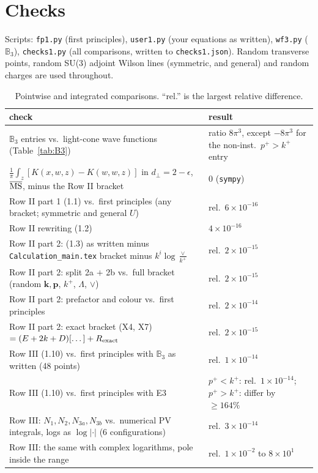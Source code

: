 \documentclass[10pt]{article}
\numberwithin{equation}{section}
\def\mf#1{\mathbb{#1}}
\newcommand{\bk}{\mathbf k}
\newcommand{\bp}{\mathbf p}
\begin{document}
\section{Checks}\label{sec:checks}
Scripts: \texttt{fp1.py} (first principles), \texttt{user1.py} (your equations as written), \texttt{wf3.py} ($\mf B_3$), \texttt{checks1.py} (all comparisons, written to \texttt{checks1.json}). Random transverse points, random SU(3) adjoint Wilson lines (symmetric, and general) and random charges are used throughout.
\begin{longtable}{@{}p{}p{}@{}}
\caption{Pointwise and integrated comparisons. ``rel.'' is the largest relative difference.}\label{tab:all}\\\toprule
check & result\\\midrule
$\mf B_3$ entries vs.\ light-cone wave functions (Table~\ref{tab:B3}) & ratio $8\pi^3$, except $-8\pi^3$ for the non-inst.\ $p^+>k^+$ entry\\
$\frac1\pi\int_z[K(x,w,z)-K(w,w,z)]$ in $d_\perp=2-\epsilon$, $\overline{\rm MS}$, minus the Row II bracket & $0$ (\texttt{sympy})\\
Row II part 1 (1.1) vs.\ first principles (any bracket; symmetric and general $U$) & rel.\ $6\times10^{-16}$\\
Row II rewriting (1.2) & $4\times10^{-16}$\\
Row II part 2: (1.3) as written minus \texttt{Calculation\_main.tex} bracket minus $k^i\log\frac{\vee}{k^+}$ & rel.\ $2\times10^{-15}$\\
Row II part 2: split 2a $+$ 2b vs.\ full bracket (random $\bk,\bp$, $k^+$, $\Lambda$, $\vee$) & rel.\ $2\times10^{-15}$\\
Row II part 2: prefactor and colour vs.\ first principles & rel.\ $2\times10^{-14}$\\
Row II part 2: exact bracket (X4, X7) $=(E+2k+D)[\dots]+R_{\rm exact}$ & rel.\ $2\times10^{-15}$\\
Row III (1.10) vs.\ first principles with $\mf B_3$ as written (48 points) & rel.\ $1\times10^{-14}$\\
Row III (1.10) vs.\ first principles with E3 & $p^+<k^+$: rel.\ $1\times10^{-14}$; $p^+>k^+$: differ by $\geq164\%$\\
Row III: $N_1,N_2,N_{3a},N_{3b}$ vs.\ numerical PV integrals, logs as $\log|\cdot|$ (6 configurations) & rel.\ $3\times10^{-14}$\\
Row III: the same with complex logarithms, pole inside the range & rel.\ $1\times10^{-2}$ to $8\times10^{1}$\\

\end{longtable}
\end{document}
